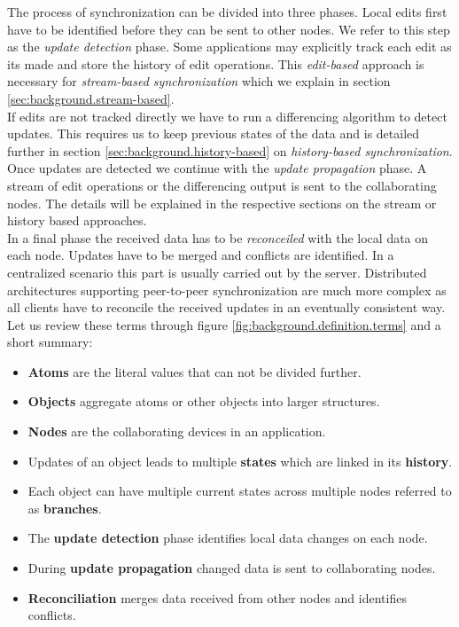 The process of synchronization can be divided into three phases.
Local edits first have to be identified before they can be sent to other nodes.
We refer to this step as the \emph{update detection} phase.
Some applications may explicitly track each edit as its made and store the history of edit operations.
This \emph{edit-based} approach is necessary for \emph{stream-based synchronization} which we explain in section \ref{sec:background.stream-based}.\\
If edits are not tracked directly we have to run a differencing algorithm to detect updates.
This requires us to keep previous states of the data and is detailed further in section \ref{sec:background.history-based} on \emph{history-based synchronization}.\\
Once updates are detected we continue with the \emph{update propagation} phase.
A stream of edit operations or the differencing output is sent to the collaborating nodes.
The details will be explained in the respective sections on the stream or history based approaches.\\
In a final phase the received data has to be \emph{reconceiled} with the local data on each node.
Updates have to be merged and conflicts are identified.
In a centralized scenario this part is usually carried out by the server.
Distributed architectures supporting peer-to-peer synchronization are much more complex as all clients have to reconcile the received updates in an eventually consistent way.\\

Let us review these terms through figure \ref{fig:background.definition.terms} and a short summary:

\begin{itemize}
\item \textbf{Atoms} are the literal values that can not be divided further.
\item \textbf{Objects} aggregate atoms or other objects into larger structures.
\item \textbf{Nodes} are the collaborating devices in an application.
\item Updates of an object leads to multiple \textbf{states} which are linked in its \textbf{history}.
\item Each object can have multiple current states across multiple nodes referred to as \textbf{branches}.
\item The \textbf{update detection} phase identifies local data changes on each node.
\item During \textbf{update propagation} changed data is sent to collaborating nodes.
\item \textbf{Reconciliation} merges data received from other nodes and identifies conflicts.
\end{itemize}

